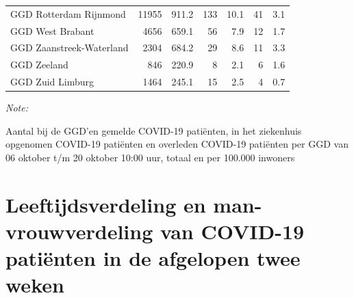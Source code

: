 \documentclass[
  english,
  man,floatsintext]{apa6}
\begin{document}
\begin{table}[H]
\begin{threeparttable}
\begin{tabular}{lrrrrrr}
GGD Rotterdam Rijnmond & 11955 & 911.2 & 133 & 10.1 & 41 & 3.1\\
GGD West Brabant & 4656 & 659.1 & 56 & 7.9 & 12 & 1.7\\
GGD Zaanstreek-Waterland & 2304 & 684.2 & 29 & 8.6 & 11 & 3.3\\
GGD Zeeland & 846 & 220.9 & 8 & 2.1 & 6 & 1.6\\
GGD Zuid Limburg & 1464 & 245.1 & 15 & 2.5 & 4 & 0.7\\
\bottomrule
\end{tabular}
\begin{tablenotes}
\item \textit{Note: } 
\item Aantal bij de GGD’en gemelde COVID-19 patiënten, in het ziekenhuis opgenomen COVID-19 patiënten en overleden COVID-19 patiënten per GGD van 06 oktober t/m 20 oktober 10:00 uur, totaal en per 100.000 inwoners
\end{tablenotes}
\end{threeparttable}
\endgroup{}
\end{table}

\newpage

\hypertarget{leeftijdsverdeling-en-man-vrouwverdeling-van-covid-19-patiuxebnten-in-de-afgelopen-twee-weken}{%
\section{Leeftijdsverdeling en man-vrouwverdeling van COVID-19 patiënten in de afgelopen twee weken}\label{leeftijdsverdeling-en-man-vrouwverdeling-van-covid-19-patiuxebnten-in-de-afgelopen-twee-weken}}
\end{document}
